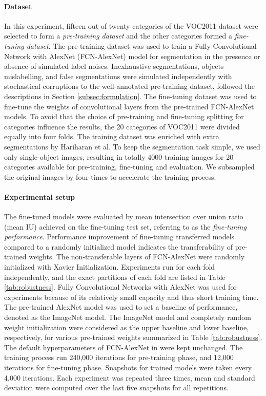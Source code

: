 \paragraph{Dataset}
In this experiment, fifteen out of twenty categories of the VOC2011 dataset were selected to form a \textit{pre-training dataset} and the other categories formed a \textit{fine-tuning dataset}.
The pre-training dataset was used to train a Fully Convolutional Network with AlexNet (FCN-AlexNet) model \cite{long2015fully} for segmentation in the presence or absence of simulated label noises.
Inexhaustive segmentations, objects mislabelling, and false segmentations were simulated independently with stochastical corruptions to the well-annotated pre-training dataset, followed the descriptions in Section \ref{subsec:formulation}.
The fine-tuning dataset was used to fine-tune the weights of convolutional layers from the pre-trained FCN-AlexNet models.
To avoid that the choice of pre-training and fine-tuning splitting for categories influence the results, the 20 categories of VOC2011 were divided equally into four folds.
The training dataset was enriched with extra segmentations by Hariharan et al. \cite{hariharan2011semantic}
To keep the segmentation task simple, we used only single-object images, resulting in totally 4000 training images for 20 categories available for pre-training, fine-tuning and evaluation.
We subsampled the original images by four times to accelerate the training process.

\paragraph{Experimental setup}
The fine-tuned models were evaluated by mean intersection over union ratio (mean IU) achieved on the fine-tuning test set, referring to as the \textit{fine-tuning performance}.
Performance improvement of fine-tuning transferred models compared to a randomly initialized model indicates the transferability of pre-trained weights.
The non-transferable layers of FCN-AlexNet were randomly initialized with Xavier Initialization.
Experiments run for each fold independently, and the exact partitions of each fold are listed in Table \ref{tab:robustness}.
Fully Convolutional Networks with AlexNet was used for experiments because of its relatively small capacity and thus short training time.
The pre-trained AlexNet model was used to set a baseline of performance, denoted as the ImageNet model.
The ImageNet model and completely random weight initialization were considered as the upper baseline and lower baseline, respectively, for various pre-trained weights summarized in Table \ref{tab:robustness}.
The default hyperparameters of FCN-AlexNet in  \cite{long2015fully} were kept unchanged.
The training process run 240,000 iterations for pre-training phase, and 12,000 iterations for fine-tuning phase.
Snapshots for trained models were taken every 4,000 iterations.
Each experiment was repeated three times, mean and standard deviation were computed over the last five snapshots for all repetitions.



